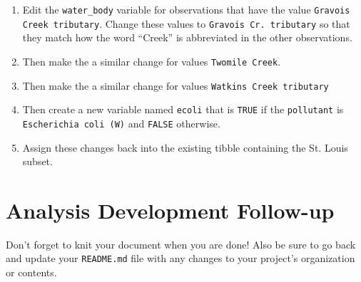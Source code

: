\documentclass{tufte-handout}
\begin{document}
\begin{enumerate}
\begin{enumerate}
\item Edit the \texttt{water\_body} variable for observations that have the value \texttt{Gravois Creek tributary}. Change these values to \texttt{Gravois Cr. tributary} so that they match how the word ``Creek'' is abbreviated in the other observations.
\item Then make the a similar change for values \texttt{Twomile Creek}.
\item Then make the a similar change for values \texttt{Watkins Creek tributary}
\item Then create a new variable named \texttt{ecoli} that is \texttt{TRUE} if the \texttt{pollutant} is \texttt{Escherichia coli (W)} and \texttt{FALSE} otherwise.
\item Assign these changes back into the existing tibble containing the St. Louis subset.
\end{enumerate}
\end{enumerate}

\vspace{5mm}
\section{Analysis Development Follow-up}
Don't forget to knit your document when you are done! Also be sure to go back and update your \texttt{README.md} file with any changes to your project's organization or contents.


\end{document}
